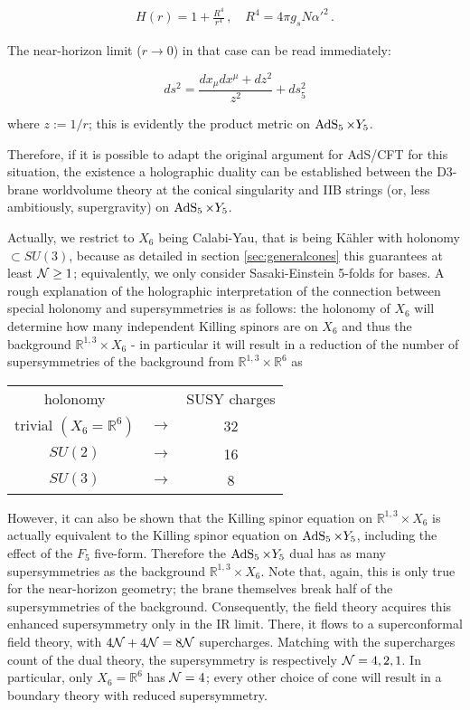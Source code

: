 \begin{align}
 H(r) = 1 + \frac{R^4}{r^4}\,,\quad R^4 = 4 \pi g_s N \alpha'^2 \,.
\end{align}

The near-horizon limit ($r\rightarrow 0$) in that case can be read immediately:

\begin{equation}
ds^2 = \frac{ dx_\mu dx^\mu + dz^2}{z^2} + ds_5^2
\end{equation}

where $z := 1/r$; this is evidently the product metric on $\operatorname{AdS}_{5} \times Y_5$.

Therefore, if it is possible to adapt the original argument for AdS/CFT for this situation, the existence a holographic duality can be established between the D3-brane worldvolume theory at the conical singularity and IIB strings (or, less ambitiously, supergravity) on $\operatorname{AdS}_{5} \times Y_5$.

Actually, we restrict to $X_6$ being Calabi-Yau, that is being K\"ahler with holonomy $\subset SU(3)$, because as detailed in section \ref{sec:generalcones} this guarantees at least $\mathcal{N} \geq 1$; equivalently, we only consider Sasaki-Einstein 5-folds for bases. A rough explanation of the holographic interpretation of the connection between special holonomy and supersymmetries is as follows: the holonomy of $X_6$ will determine how many independent Killing spinors are on $X_6$ and thus the background $\mathbb{R}^{1,3} \times X_6$ - in particular it will result in a reduction of the number of supersymmetries of the background from $\mathbb{R}^{1,3} \times \mathbb{R}^6$ as

\begin{center}
	\begin{tabular}{ccc}
	holonomy & & SUSY charges \\
	trivial $(X_6 = \mathbb{R}^6)$ 	&$\longrightarrow$ & 32\\
	$SU(2)$ 			&$\longrightarrow$ & 16\\
	$SU(3)$				&$\longrightarrow$ & 8
\end{tabular}\end{center}

However, it can also be shown\cite{KW_SCFT} that the Killing spinor equation on $\mathbb{R}^{1,3} \times X_6$ is actually equivalent to the Killing spinor equation on $\operatorname{AdS}_{5} \times Y_5$, including the effect of the $F_5$ five-form. Therefore the $\operatorname{AdS}_{5} \times Y_5$ dual has as many supersymmetries as the background $\mathbb{R}^{1,3} \times X_6$. Note that, again, this is only true for the near-horizon geometry; the brane themselves break half of the supersymmetries of the background. Consequently, the field theory acquires this enhanced supersymmetry only in the IR limit. There, it flows to a superconformal field theory, with $4\mathcal{N} + 4 \mathcal{N} = 8 \mathcal{N}$ supercharges. Matching with the supercharges count of the dual theory, the supersymmetry is respectively $\mathcal{N} = 4,2,1$. In particular, only $X_6 = \mathbb{R}^6$ has $\mathcal{N} = 4$; every other choice of cone will result in a boundary theory with reduced supersymmetry.

